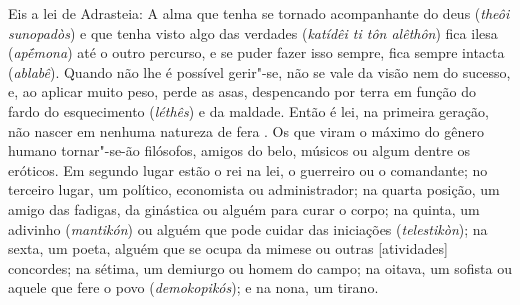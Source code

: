 Eis a lei de Adrasteia: A alma que tenha se tornado acompanhante do deus
(\emph{theôi sunopadòs}) e que tenha visto algo das verdades
(\emph{katídêi ti tôn alêthôn}) fica ilesa (\emph{apḗmona}) até o outro
percurso, e se puder fazer isso sempre, fica sempre intacta
(\emph{ablabê}). Quando não lhe é possível gerir"-se, não se vale da
visão nem do sucesso, e, ao aplicar muito peso, perde as asas,
despencando por terra em função do fardo do esquecimento (\emph{léthês})
e da maldade. Então é lei, na primeira geração, não nascer em nenhuma
natureza de fera \bekker{[248d]}. Os que viram o máximo do gênero humano
tornar"-se-ão filósofos, amigos do belo, músicos ou algum dentre os
eróticos. Em segundo lugar estão o rei na lei, o guerreiro ou o
comandante; no terceiro lugar, um político, economista ou administrador;
na quarta posição, um amigo das fadigas, da ginástica ou alguém para
curar o corpo; na quinta, um adivinho (\emph{mantikón}) ou alguém que
pode cuidar das iniciações (\emph{telestikòn}); \bekker{[248e]} na sexta, um
poeta, alguém que se ocupa da mimese ou outras [atividades]
concordes; na sétima, um demiurgo ou homem do campo; na oitava, um sofista
ou aquele que fere o povo (\emph{demokopikós}); e na nona, um tirano.

